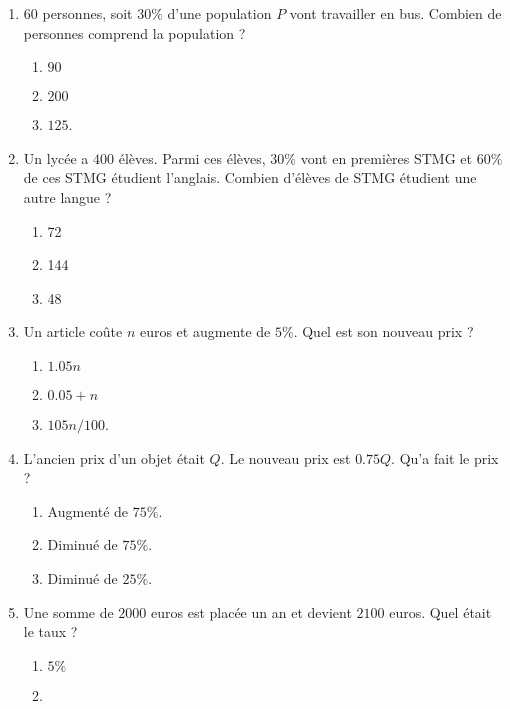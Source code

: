 \begin{exercice}
\begin{multicols}{2}
\begin{enumerate}
    \item
        \( 60\) personnes, soit \( 30\%\) d'une population \( P\) vont travailler en bus. Combien de personnes comprend la population ?
        \begin{enumerate}
            \item
                $90$
            \item
                \( 200\)
            \item
                \( 125\).
        \end{enumerate}
    \item
        Un lycée a \( 400\) élèves. Parmi ces élèves, \( 30\%\) vont en premières STMG et \( 60\%\) de ces STMG étudient l'anglais. Combien d'élèves de STMG étudient une autre langue ?
        \begin{enumerate}
            \item
                72
            \item
                144
            \item
                48
        \end{enumerate}
    \item
        Un article coûte \( n\) euros et augmente de \( 5\%\). Quel est son nouveau prix ?
        \begin{enumerate}
            \item
                \( 1.05n\)
            \item
                \( 0.05+n\)
            \item
                \( 105n/100\).
        \end{enumerate}
    \item
        L'ancien prix d'un objet était \( Q\). Le nouveau prix est \( 0.75Q\). Qu'a fait le prix ?
        \begin{enumerate}
            \item
                Augmenté de \( 75\%\).
            \item
                Diminué de \( 75\%\).
            \item
                Diminué de \( 25\%\).
        \end{enumerate}
    \item
        Une somme de \( 2000\) euros est placée un an et devient \( 2100\) euros. Quel était le taux ?
        \begin{enumerate}
            \item
                \( 5\%\)
            \item

\end{enumerate}
\end{enumerate}
\end{multicols}
\end{exercice}
